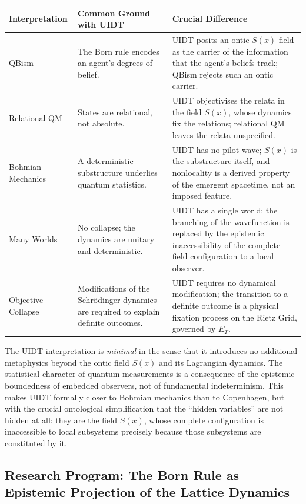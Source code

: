 \documentclass[12pt,a4paper,twoside]{article}
\theoremstyle{plain}
\theoremstyle{definition}
\theoremstyle{remark}
\begin{document}
\begin{center}
\begin{tabular}{>{\raggedright}p{3.5cm} p{5.5cm} p{5.5cm}}
\toprule
\textbf{Interpretation} & \textbf{Common Ground with UIDT} & \textbf{Crucial Difference} \\
\midrule
QBism & The Born rule encodes an agent's degrees of belief. & UIDT posits an ontic $S(x)$ field as the carrier of the information that the agent's beliefs track; QBism rejects such an ontic carrier. \\
\addlinespace
Relational QM & States are relational, not absolute. & UIDT objectivises the relata in the field $S(x)$, whose dynamics fix the relations; relational QM leaves the relata unspecified. \\
\addlinespace
Bohmian Mechanics & A deterministic substructure underlies quantum statistics. & UIDT has no pilot wave; $S(x)$ is the substructure itself, and nonlocality is a derived property of the emergent spacetime, not an imposed feature. \\
\addlinespace
Many Worlds & No collapse; the dynamics are unitary and deterministic. & UIDT has a single world; the branching of the wavefunction is replaced by the epistemic inaccessibility of the complete field configuration to a local observer. \\
\addlinespace
Objective Collapse & Modifications of the Schrödinger dynamics are required to explain definite outcomes. & UIDT requires no dynamical modification; the transition to a definite outcome is a physical fixation process on the Rietz Grid, governed by $E_T$. \\
\bottomrule
\end{tabular}
\end{center}

The UIDT interpretation is \emph{minimal} in the sense that it introduces no
additional metaphysics beyond the ontic field $S(x)$ and its Lagrangian
dynamics. The statistical character of quantum measurements is a consequence
of the epistemic boundedness of embedded observers, not of fundamental
indeterminism.
\clearpage
This makes UIDT formally closer to Bohmian mechanics than to
Copenhagen, but with the crucial ontological simplification that the
``hidden variables'' are not hidden at all: they are the field $S(x)$,
whose complete configuration is inaccessible to local subsystems precisely
because those subsystems are constituted by it.

\subsection{Research Program: The Born Rule as Epistemic Projection of the Lattice Dynamics}
\label{subsec:born-rule}
\end{document}
